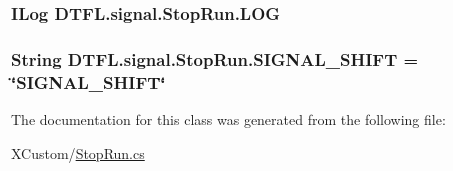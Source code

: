 \subsubsection[{\texorpdfstring{L\+OG}{LOG}}]{\setlength{\rightskip}{0pt plus 5cm}I\+Log D\+T\+F\+L.\+signal.\+Stop\+Run.\+L\+OG}\hypertarget{class_d_t_f_l_1_1signal_1_1_stop_run_a7d595d8b32390bd020c278714248bc6f}{}\label{class_d_t_f_l_1_1signal_1_1_stop_run_a7d595d8b32390bd020c278714248bc6f}
\subsubsection[{\texorpdfstring{S\+I\+G\+N\+A\+L\+\_\+\+S\+H\+I\+FT}{SIGNAL_SHIFT}}]{\setlength{\rightskip}{0pt plus 5cm}String D\+T\+F\+L.\+signal.\+Stop\+Run.\+S\+I\+G\+N\+A\+L\+\_\+\+S\+H\+I\+FT = \char`\"{}S\+I\+G\+N\+A\+L\+\_\+\+S\+H\+I\+FT\char`\"{}\hspace{0.3cm}{\ttfamily [static]}}\hypertarget{class_d_t_f_l_1_1signal_1_1_stop_run_ab33b4ca39a31cf6b11aaa2ed95dd2c0d}{}\label{class_d_t_f_l_1_1signal_1_1_stop_run_ab33b4ca39a31cf6b11aaa2ed95dd2c0d}


The documentation for this class was generated from the following file\+:\begin{DoxyCompactItemize}
\item 
X\+Custom/\hyperlink{_stop_run_8cs}{Stop\+Run.\+cs}\end{DoxyCompactItemize}
